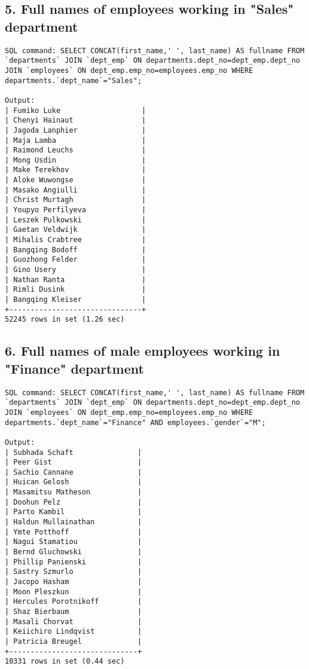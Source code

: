 \documentclass{report}
\begin{document}
\subsection*{5. Full names of employees working in "Sales" department}
\begin{lstlisting}
SQL command: SELECT CONCAT(first_name,' ', last_name) AS fullname FROM `departments` JOIN `dept_emp` ON departments.dept_no=dept_emp.dept_no JOIN `employees` ON dept_emp.emp_no=employees.emp_no WHERE departments.`dept_name`="Sales";

Output:
| Fumiko Luke                   |
| Chenyi Hainaut                |
| Jagoda Lanphier               |
| Maja Lamba                    |
| Raimond Leuchs                |
| Mong Usdin                    |
| Make Terekhov                 |
| Aloke Wuwongse                |
| Masako Angiulli               |
| Christ Murtagh                |
| Youpyo Perfilyeva             |
| Leszek Pulkowski              |
| Gaetan Veldwijk               |
| Mihalis Crabtree              |
| Bangqing Bodoff               |
| Guozhong Felder               |
| Gino Usery                    |
| Nathan Ranta                  |
| Rimli Dusink                  |
| Bangqing Kleiser              |
+-------------------------------+
52245 rows in set (1.26 sec)

\end{lstlisting}

\subsection*{6. Full names of male employees working in "Finance" department}
\begin{lstlisting}
SQL command: SELECT CONCAT(first_name,' ', last_name) AS fullname FROM `departments` JOIN `dept_emp` ON departments.dept_no=dept_emp.dept_no JOIN `employees` ON dept_emp.emp_no=employees.emp_no WHERE departments.`dept_name`="Finance" AND employees.`gender`="M";

Output:
| Subhada Schaft               |
| Peer Gist                    |
| Sachio Cannane               |
| Huican Gelosh                |
| Masamitsu Matheson           |
| Doohun Pelz                  |
| Parto Kambil                 |
| Haldun Mullainathan          |
| Ymte Potthoff                |
| Nagui Stamatiou              |
| Bernd Gluchowski             |
| Phillip Panienski            |
| Sastry Szmurlo               |
| Jacopo Hasham                |
| Moon Pleszkun                |
| Hercules Porotnikoff         |
| Shaz Bierbaum                |
| Masali Chorvat               |
| Keiichiro Lindqvist          |
| Patricia Breugel             |
+------------------------------+
10331 rows in set (0.44 sec)

\end{lstlisting}
\end{document}
